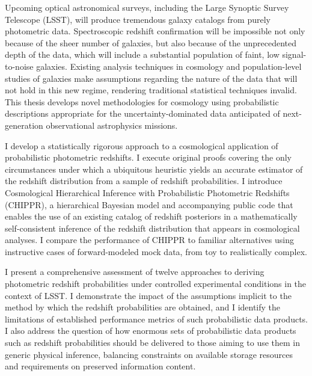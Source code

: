 Upcoming optical astronomical surveys, including the Large Synoptic Survey Telescope (LSST), will produce tremendous galaxy catalogs from purely photometric data.
Spectroscopic redshift confirmation will be impossible not only because of the sheer number of galaxies, but also because of the unprecedented depth of the data, which will include a substantial population of faint, low signal-to-noise galaxies.
Existing analysis techniques in cosmology and population-level studies of galaxies make assumptions regarding the nature of the data that will not hold in this new regime, rendering traditional statistical techniques invalid.
This thesis develops novel methodologies for cosmology using probabilistic descriptions appropriate for the uncertainty-dominated data anticipated of next-generation observational astrophysics missions. 

I develop a statistically rigorous approach to a cosmological application of probabilistic photometric redshifts.
I execute original proofs covering the only circumstances under which a ubiquitous heuristic yields an accurate estimator of the redshift distribution from a sample of redshift probabilities.
I introduce Cosmological Hierarchical Inference with Probabilistic Photometric Redshifts (CHIPPR), a hierarchical Bayesian model and accompanying public code that enables the use of an existing catalog of redshift posteriors in a mathematically self-consistent inference of the redshift distribution that appears in cosmological analyses.
I compare the performance of CHIPPR to familiar alternatives using instructive cases of forward-modeled mock data, from toy to realistically complex.

I present a comprehensive assessment of twelve approaches to deriving photometric redshift probabilities under controlled experimental conditions in the context of LSST.
I demonstrate the impact of the assumptions implicit to the method by which the redshift probabilities are obtained, and I identify the limitations of established performance metrics of such probabilistic data products.
I also address the question of how enormous sets of probabilistic data products such as redshift probabilities should be delivered to those aiming to use them in generic physical inference, balancing constraints on available storage resources and requirements on preserved information content.


